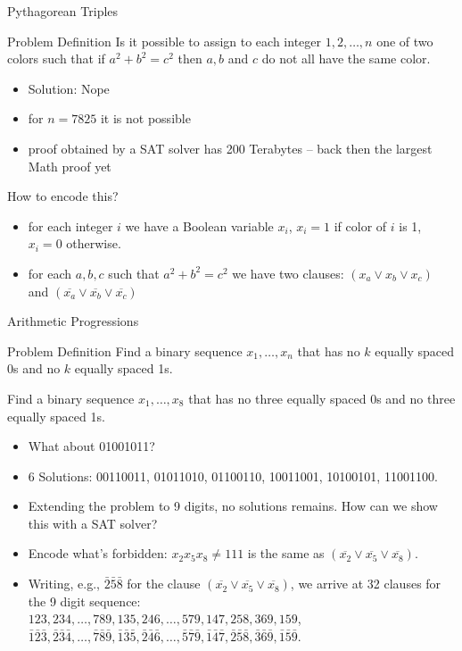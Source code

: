 \documentclass[t]{sdqbeamer}
\begin{document}
\begin{frame}{Pythagorean Triples}
\begin{block}{Problem Definition}
Is it possible to assign to each integer $1,2,\ldots,n$ one of two colors such that if
$a^2+b^2=c^2$ then $a,b$ and $c$ do not all have the same color.
\end{block}
\begin{itemize}
	\item Solution: Nope
	\item for $n=7825$ it is not possible
	\item proof obtained by a SAT solver has 200 Terabytes -- back then the largest Math proof yet
\end{itemize}
\pause
\begin{block}{How to encode this?}
\begin{itemize}
	\item for each integer $i$ we have a Boolean variable $x_i$, $x_i=1$ if color of $i$ is 1, $x_i=0$ otherwise.
	\item for each $a,b,c$ such that $a^2+b^2=c^2$ we have two clauses: $(x_a \vee x_b \vee x_c)$
	and $(\overline{x_a} \vee \overline{x_b} \vee \overline{x_c})$
\end{itemize}
\end{block}
\end{frame}


\begin{frame}{Arithmetic Progressions}
\begin{block}{Problem Definition}
	Find a binary sequence $x_1, \dots, x_n$ that has no $k$ equally spaced 0s and no $k$ equally spaced 1s.
\end{block}
\pause
\begin{example}[$n=8, k=3$]
Find a binary sequence $x_1,\dots,x_8$ that has no three equally spaced 0s and no three equally spaced 1s.
\begin{itemize}
\item<2-> What about 01001011? 
\item<4-> 6 Solutions: 00110011, 01011010, 01100110, 10011001, 10100101, 11001100.
\item<5-> Extending the problem to 9 digits, no solutions remains. How can we show this with a SAT solver?
\item<6-> Encode what's forbidden: $x_2 x_5 x_8 \neq 111$ is the same as
   $(\overline{x_2} \lor \overline{x_5} \lor \overline{x_8})$.
\item<7-> Writing, e.g., $\bar 2 \bar 5 \bar 8$ for the clause $(\overline{x_2} \lor \overline{x_5} \lor \overline{x_8})$, we arrive
  at 32 clauses for the 9 digit sequence: \\
  $123, 234, \dots, 789, 135, 246, \dots, 579, 147, 258, 369, 159$,
  $\bar 1 \bar 2 \bar 3, \bar 2 \bar 3 \bar 4, \dots, \bar 7 \bar 8 \bar 9, \bar 1 \bar 3 \bar 5, \bar 2 \bar 4 \bar 6, 
  \dots, \bar 5 \bar 7 \bar 9, \bar 1 \bar 4 \bar 7, \bar 2 \bar 5 \bar 8, \bar 3 \bar 6 \bar 9, \bar 1 \bar 5 \bar 9$.
\end{itemize}
\end{example}
\end{frame}
\end{document}
